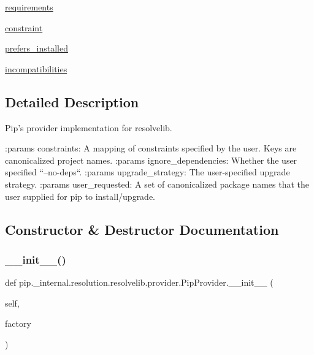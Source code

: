 \begin{DoxyCompactItemize}
\item 
\hyperlink{classpip_1_1__internal_1_1resolution_1_1resolvelib_1_1provider_1_1PipProvider_a3a87829e768e90ee2d47222cd4a118ee}{requirements}
\item 
\hyperlink{classpip_1_1__internal_1_1resolution_1_1resolvelib_1_1provider_1_1PipProvider_ac5838c851beccdb65668e2024f3a3473}{constraint}
\item 
\hyperlink{classpip_1_1__internal_1_1resolution_1_1resolvelib_1_1provider_1_1PipProvider_a2e73ac81ccbc4bd2bdd79dc45c6237c5}{prefers\+\_\+installed}
\item 
\hyperlink{classpip_1_1__internal_1_1resolution_1_1resolvelib_1_1provider_1_1PipProvider_a8bd95fea93995b3bb38bfc3092350b6b}{incompatibilities}
\end{DoxyCompactItemize}


\subsection{Detailed Description}
\begin{DoxyVerb}Pip's provider implementation for resolvelib.

:params constraints: A mapping of constraints specified by the user. Keys
    are canonicalized project names.
:params ignore_dependencies: Whether the user specified ``--no-deps``.
:params upgrade_strategy: The user-specified upgrade strategy.
:params user_requested: A set of canonicalized package names that the user
    supplied for pip to install/upgrade.
\end{DoxyVerb}
 

\subsection{Constructor \& Destructor Documentation}
\mbox{\label{classpip_1_1__internal_1_1resolution_1_1resolvelib_1_1provider_1_1PipProvider_a7830436056aafdb8efc015d587fa9286}} 
\subsubsection{\texorpdfstring{\+\_\+\+\_\+init\+\_\+\+\_\+()}{\_\_init\_\_()}}
{\footnotesize\ttfamily def pip.\+\_\+internal.\+resolution.\+resolvelib.\+provider.\+Pip\+Provider.\+\_\+\+\_\+init\+\_\+\+\_\+ (\begin{DoxyParamCaption}\item[{}]{self,  }\item[{}]{factory }\end{DoxyParamCaption})}



